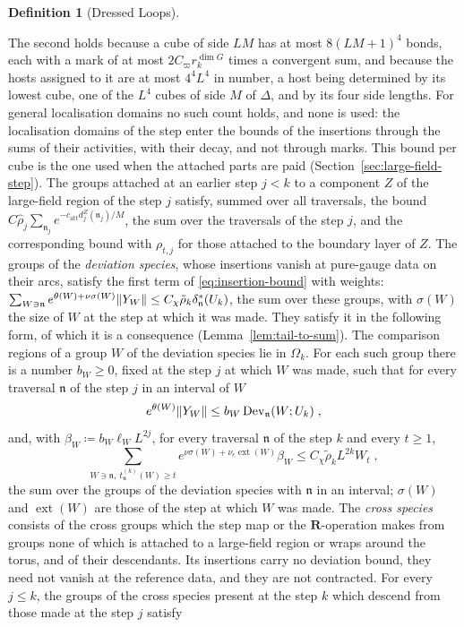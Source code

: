 \documentclass[11pt]{preprint}
\DeclarePairedDelimiter{\norm}{\lVert}{\rVert}
\numberwithin{equation}{section}
\theoremstyle{definition}
\newtheorem{definition}[theorem]{Definition}
\theoremstyle{remark}
\theoremstyle{plain}
\begin{document}
\begin{definition}[Dressed Loops]
\begin{enumerate}[label=(\roman*)]
The second holds because a cube of side $LM$ has at most $8(LM + 1)^4$ bonds, each with a mark of at most $2C_\varpi r_k^{\dim G}$ times a convergent sum, and because the hosts assigned to it are at most $4^4L^4$ in number, a host being determined by its lowest cube, one of the $L^4$ cubes of side $M$ of $\Delta$, and by its four side lengths. For general localisation domains no such count holds, and none is used: the localisation domains of the step enter the bounds of the insertions through the sums of their activities, with their decay, and not through marks. This bound per cube is the one used when the attached parts are paid (Section~\ref{sec:large-field-step}). The groups attached at an earlier step $j < k$ to a component $Z$ of the large-field region of the step $j$ satisfy, summed over all traversals, the bound $C\hat\rho_j\sum_{\mathfrak n_j}e^{-c_{\mathrm{att}}d^Z_j(\mathfrak n_j)/M}$, the sum over the traversals of the step $j$, and the corresponding bound with $\rho_{t,j}$ for those attached to the boundary layer of $Z$. The groups of the \emph{deviation species}, whose insertions vanish at pure-gauge data on their arcs, satisfy the first term of \eqref{eq:insertion-bound} with weights: $\sum_{W \ni \mathfrak n}e^{\theta(W) + \nu\sigma(W)}\norm{Y_W} \leq C_\chi\tilde\rho_k\delta^{*}_{\mathfrak n}(U_k)$, the sum over these groups, with $\sigma(W)$ the size of $W$ at the step at which it was made. They satisfy it in the following form, of which it is a consequence (Lemma~\ref{lem:tail-to-sum}). The comparison regions of a group $W$ of the deviation species lie in $\Omega_k$. For each such group there is a number $b_W \geq 0$, fixed at the step $j$ at which $W$ was made, such that for every traversal $\mathfrak n$ of the step $j$ in an interval of $W$
\begin{equation}\label{eq:per-insertion}
    e^{\theta(W)}\norm{Y_W} \leq b_W\operatorname{Dev}_{\mathfrak n}(W; U_k)\;,
\end{equation}
and, with $\beta_W \coloneqq b_W\ell_WL^{2j}$, for every traversal $\mathfrak n$ of the step $k$ and every $t \geq 1$,
\begin{equation}\label{eq:tail-clause}
    \sum_{W \ni \mathfrak n,\ t^{(k)}_{\mathfrak n}(W) \geq t}e^{\nu\sigma(W) + \nu_e\operatorname{ext}(W)}\beta_W \leq C_\chi\tilde\rho_kL^{2k}W_t\;,
\end{equation}
the sum over the groups of the deviation species with $\mathfrak n$ in an interval; $\sigma(W)$ and $\operatorname{ext}(W)$ are those of the step at which $W$ was made. The \emph{cross species} consists of the cross groups which the step map or the $\mathbf R$-operation makes from groups none of which is attached to a large-field region or wraps around the torus, and of their descendants. Its insertions carry no deviation bound, they need not vanish at the reference data, and they are not contracted. For every $j \leq k$, the groups of the cross species present at the step $k$ which descend from those made at the step $j$ satisfy

\end{enumerate}
\end{definition}
\end{document}
